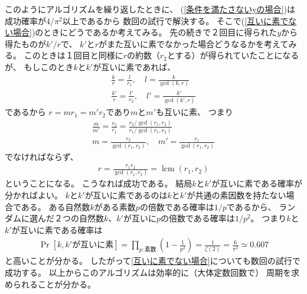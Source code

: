 \documentclass[a4paper, 10pt]{jsarticle}
\DeclareMathOperator{\lcm}{lcm}
\begin{document}
このようにアルゴリズムを繰り返したときに、
(\ref{条件を満たさないyの場合})は成功確率が$4/\pi^2$以上であるから
数回の試行で解決する。
そこで(\ref{互いに素でない場合})のときにどうであるか考えてみる。
先の続きで２回目に得られた$y$から得たものが$k'/r$で、
$k'$と$r$がまた互いに素でなかった場合どうなるかを考えてみる。
このときは１回目と同様に$r$の約数（$r_2$とする）が得られていたことになるが、
もしこのとき$k$と$k'$が互いに素であれば、
\begin{align}
	\frac{k}{r} = \frac{l}{r_1}, \quad l = \frac{k}{\gcd (k, r)} \\
	\frac{k'}{r} = \frac{l'}{r_2}, \quad l' = \frac{k'}{\gcd (k', r)}
\end{align}
であるから
$r = m r_1 = m' r_2$であり$m$と$m'$も互いに素、
つまり
\begin{gather}
	\frac{m}{m'} = \frac{r_2}{r_1}
	= \frac{r_2 / \gcd(r_1, r_2)}{r_1 / \gcd (r_1, r_2)} \\
	m = \frac{r_2}{\gcd (r_1, r_2)}, \quad
	m' = \frac{r_1}{\gcd (r_1, r_2)}
\end{gather}
でなければならず、
\begin{align}
	r = \frac{r_1 r_2}{\gcd (r_1, r_2)} = \lcm (r_1, r_2)
\end{align}
ということになる。
こうなれば成功である。
結局$k$と$k'$が互いに素である確率が分かればよい。
$k$と$k'$が互いに素であるのは$k$と$k'$が共通の素因数を持たない場合である。
ある自然数$k$がある素数$p$の倍数である確率は$1/p$であるから、
ランダムに選んだ２つの自然数$k$、$k'$が互いに$p$の倍数である確率は$1/p^2$。
つまり$k$と$k'$が互いに素である確率は
\begin{align}
	\Pr \left[ k, k' \text{が互いに素} \right]
	= \prod_{p: 素数} \left( 1 - \frac{1}{p^2} \right)
	= \frac{1}{\zeta(2)}
	= \frac{6}{\pi^2}
	\simeq 0.607
\end{align}
と高いことが分かる。
したがって\ref{互いに素でない場合}についても数回の試行で成功する。
以上からこのアルゴリズムは効率的に（大体定数回数で）
周期を求められることが分かる。
\end{document}
